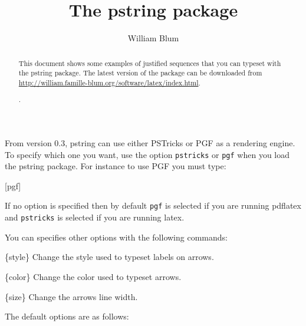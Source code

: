 
%


\author{William Blum}
\title{The pstring package}

\maketitle
\begin{abstract}
This document shows some examples of justified sequences that you
can typeset with the pstring package.
The latest version of the package can be downloaded from \url{http://william.famille-blum.org/software/latex/index.html}.

\begin{codeexample}[width=5cm]
.
\end{codeexample}

\end{abstract}

From version 0.3, pstring can use either PSTricks or PGF as a rendering engine. To specify which one
you want, use the option \verb|pstricks| or \verb|pgf| when you load the pstring package. For instance to use PGF you must type:
\begin{codeexample}
\usepackage{pstring}[pgf]
\end{codeexample}
If no option is specified then by default \verb|pgf| is selected if you are running pdflatex
and \verb|pstricks| is selected if you are running latex.

You can specifies other options with the following commands:
\begin{command}{\pstrSetLabelStyle\{style\}}
Change the style used to typeset labels on arrows.
\end{command}
\begin{command}{\pstrSetArrowColor\{color\}}
Change the color used to typeset arrows.
\end{command}
\begin{command}{\pstrSetArrowLineWidth\{size\}}
Change the arrows line width.
\end{command}
The default options are as follows:
\begin{codeexample}
\pstrSetLabelStyle{\color{blue} \tiny}
\pstrSetArrowLineWidth{0.3pt}
\end{codeexample}

